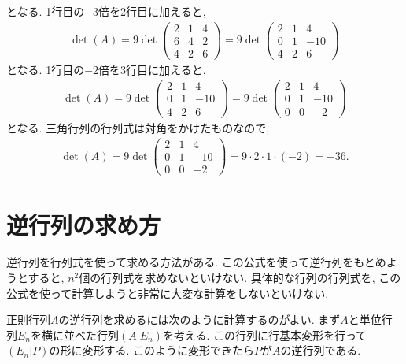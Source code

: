となる.
1行目の$-3$倍を2行目に加えると,
\begin{align*}
  \det(A)
  =
  9\det
  \begin{pmatrix}
    2&1&4\\
    6&4&2\\
    4&2&6
  \end{pmatrix}
  =
  9\det
  \begin{pmatrix}
    2&1&4\\
    0&1&-10\\
    4&2&6
  \end{pmatrix}
\end{align*}
となる.
1行目の$-2$倍を3行目に加えると,
\begin{align*}
  \det(A)
  =
  9\det
  \begin{pmatrix}
    2&1&4\\
    0&1&-10\\
    4&2&6
  \end{pmatrix}
  =
  9\det
  \begin{pmatrix}
    2&1&4\\
    0&1&-10\\
    0&0&-2
  \end{pmatrix}
\end{align*}
となる.
三角行列の行列式は対角をかけたものなので,
\begin{align*}
  \det(A)
  =
  9\det
  \begin{pmatrix}
    2&1&4\\
    0&1&-10\\
    0&0&-2
  \end{pmatrix}
  =9\cdot 2\cdot 1\cdot(-2)=-36.
\end{align*}



\section{逆行列の求め方}
逆行列を行列式を使って求める方法がある.
この公式を使って逆行列をもとめようとすると,
$n^2$個の行列式を求めないといけない.
具体的な行列の行列式を,
この公式を使って計算しようと非常に大変な計算をしないといけない.

正則行列$A$の逆行列を求めるには次のように計算するのがよい.
まず$A$と単位行列$E_n$を横に並べた行列$(A|E_n)$を考える.
この行列に行基本変形を行って$(E_n|P)$の形に変形する.
このように変形できたら$P$が$A$の逆行列である.


